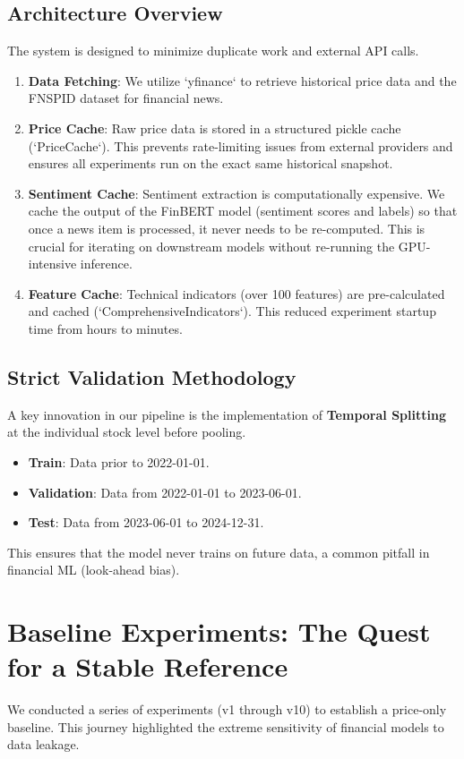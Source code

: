\documentclass{article}
\begin{document}
\subsection{Architecture Overview}
The system is designed to minimize duplicate work and external API calls.
\begin{enumerate}
    \item \textbf{Data Fetching}: We utilize `yfinance` to retrieve historical price data and the FNSPID dataset for financial news.
    \item \textbf{Price Cache}: Raw price data is stored in a structured pickle cache (`PriceCache`). This prevents rate-limiting issues from external providers and ensures all experiments run on the exact same historical snapshot.
    \item \textbf{Sentiment Cache}: Sentiment extraction is computationally expensive. We cache the output of the FinBERT model (sentiment scores and labels) so that once a news item is processed, it never needs to be re-computed. This is crucial for iterating on downstream models without re-running the GPU-intensive inference.
    \item \textbf{Feature Cache}: Technical indicators (over 100 features) are pre-calculated and cached (`ComprehensiveIndicators`). This reduced experiment startup time from hours to minutes.
\end{enumerate}

\subsection{Strict Validation Methodology}
A key innovation in our pipeline is the implementation of \textbf{Temporal Splitting} at the individual stock level before pooling. 
\begin{itemize}
    \item \textbf{Train}: Data prior to 2022-01-01.
    \item \textbf{Validation}: Data from 2022-01-01 to 2023-06-01.
    \item \textbf{Test}: Data from 2023-06-01 to 2024-12-31.
\end{itemize}
This ensures that the model never trains on future data, a common pitfall in financial ML (look-ahead bias).

\section{Baseline Experiments: The Quest for a Stable Reference}
We conducted a series of experiments (v1 through v10) to establish a price-only baseline. This journey highlighted the extreme sensitivity of financial models to data leakage.
\end{document}
